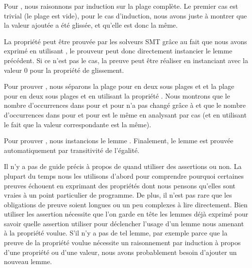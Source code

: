 Pour , nous raisonnons par induction sur la
plage complète. Le premier cas est trivial (le plage est vide), pour le cas
d'induction, nous avons juste à montrer que la valeur ajoutée a été glissée, et
qu'elle est donc la même.


La propriété  peut être prouvée par les
solveurs SMT grâce au fait que nous avons exprimé  en
utilisant , le prouveur peut donc directement instancier le
lemme précédent. Si ce n'est pas le cas, la preuve peut être réaliser en
instanciant  avec la valeur 0 pour la
propriété de glissement.


Pour prouver , nous séparons la plage
pour  en deux sous plages  et
 et la plage pour  en deux sous plages
 et  en utilisant la propriété
. Nous montrons que le nombre d'occurrences
dans  pour  et 
pour  n'a pas changé grâce à 
et que le nombre d'occurrences dans  pour
 et  pour  est le même
en analysant par cas (et en utilisant le fait que la valeur correspondante est
la même).


Pour prouver , nous instancions le lemme
. Finalement, le lemme
 est prouvée automatiquement par transitivité
de l'égalité.




Il n'y a pas de guide précis à propos de quand utiliser des assertions ou non.
La plupart du temps nous les utilisons d'abord pour comprendre pourquoi certaines
preuves échouent en exprimant des propriétés dont nous pensons qu'elles sont vraies
à un point particulier de programme. De plus, il n'est pas rare que les obligations
de preuve soient longues ou un peu complexes à lire directement. Bien utiliser les
assertion nécessite que l'on garde en tête les lemmes déjà exprimé pour savoir
quelle assertion utiliser pour déclencher l'usage d'un lemme nous amenant à la
propriété voulue. S'il n'y a pas de tel lemme, par exemple parce que la preuve
de la propriété voulue nécessite un raisonnement par induction à propos d'une
propriété ou d'une valeur, nous avons probablement besoin d'ajouter un nouveau
lemme.


